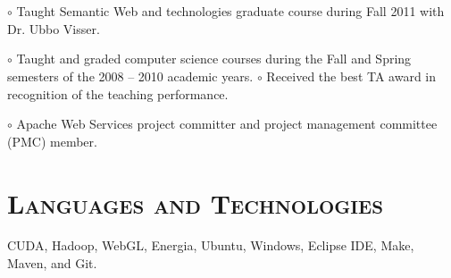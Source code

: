\begin{resume}
\begin{formatb}
  \\
  \body\\
\end{formatb}

\begin{position}
$\circ$  Taught Semantic Web and technologies graduate course during Fall 2011 with Dr.
Ubbo Visser.  
\end{position}

\begin{position}
$\circ$  Taught and graded computer science courses during the Fall and Spring
semesters of the 2008 -- 2010 academic years. \newline $\circ$   Received the best TA award in recognition of the teaching
performance.
\end{position}


\begin{position}
$\circ$  Apache Web Services project committer  and project management committee (PMC)  member.
\end{position}

\vspace{-2mm}
\section{\textsc{Languages and Technologies}}

\dates{~}
\begin{position}
CUDA, Hadoop, WebGL, Energia, Ubuntu, Windows, Eclipse IDE, Make, Maven, and
Git.
\end{position}





\end{resume}
